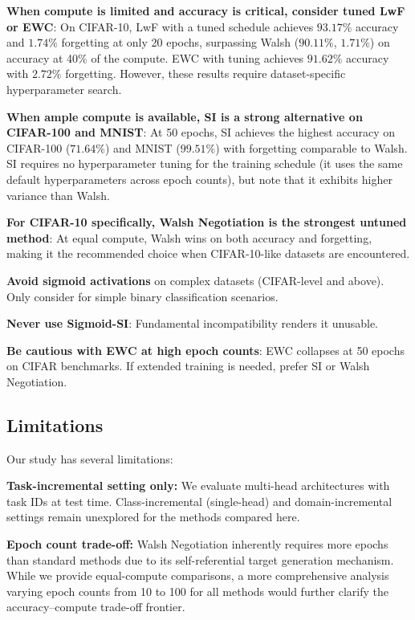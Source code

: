 \documentclass[preprint,review,12pt]{elsarticle}
\begin{document}
\textbf{When compute is limited and accuracy is critical, consider tuned LwF or EWC}: On CIFAR-10, LwF with a tuned schedule achieves $93.17\%$ accuracy and $1.74\%$ forgetting at only 20 epochs, surpassing Walsh ($90.11\%$, $1.71\%$) on accuracy at 40\% of the compute. EWC with tuning achieves $91.62\%$ accuracy with $2.72\%$ forgetting. However, these results require dataset-specific hyperparameter search.

\textbf{When ample compute is available, SI is a strong alternative on CIFAR-100 and MNIST}: At 50 epochs, SI achieves the highest accuracy on CIFAR-100 ($71.64\%$) and MNIST ($99.51\%$) with forgetting comparable to Walsh. SI requires no hyperparameter tuning for the training schedule (it uses the same default hyperparameters across epoch counts), but note that it exhibits higher variance than Walsh.

\textbf{For CIFAR-10 specifically, Walsh Negotiation is the strongest untuned method}: At equal compute, Walsh wins on both accuracy and forgetting, making it the recommended choice when CIFAR-10-like datasets are encountered.

\textbf{Avoid sigmoid activations} on complex datasets (CIFAR-level and above). Only consider for simple binary classification scenarios.

\textbf{Never use Sigmoid-SI}: Fundamental incompatibility renders it unusable.

\textbf{Be cautious with EWC at high epoch counts}: EWC collapses at 50 epochs on CIFAR benchmarks. If extended training is needed, prefer SI or Walsh Negotiation.

\subsection{Limitations}

Our study has several limitations:

\textbf{Task-incremental setting only:} We evaluate multi-head architectures with task IDs at test time. Class-incremental (single-head) and domain-incremental settings remain unexplored for the methods compared here.

\textbf{Epoch count trade-off:} Walsh Negotiation inherently requires more epochs than standard methods due to its self-referential target generation mechanism. While we provide equal-compute comparisons, a more comprehensive analysis varying epoch counts from 10 to 100 for all methods would further clarify the accuracy--compute trade-off frontier.
\end{document}
